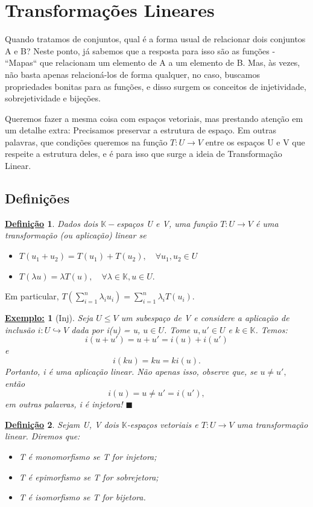 \documentclass{article}
\newtheorem*{def*}{\underline{Defini\c c\~ao}}
\newtheorem{example}{\underline{Exemplo:}}[section]
\renewcommand\qedsymbol{$\blacksquare$}
\begin{document}
\section{Transforma\c c\~oes Lineares}
Quando tratamos de conjuntos, qual \'e a forma usual de relacionar dois conjuntos A e B? Neste ponto, j\'a sabemos que a resposta para
isso s\~ao as fun\c c\~oes - ``Mapas`` que relacionam um elemento de A a um elemento de B. Mas, \`as vezes, n\~ao basta apenas relacion\'a-los de forma qualquer, no caso, buscamos propriedades bonitas para as fun\c c\~oes, e disso surgem os conceitos de injetividade,
sobrejetividade e bije\c c\~oes.

Queremos fazer a mesma coisa com espa\c cos vetoriais, mas prestando aten\c c\~ao em um detalhe extra: Precisamos
preservar a estrutura de espa\c co. Em outras palavras, que condi\c c\~oes queremos na fun\c c\~ao $T:U\rightarrow{V}$
entre os espa\c cos U e V que respeite a estrutura deles, e \'e para isso que surge a ideia de Transforma\c c\~ao
Linear.

\subsection{Defini\c c\~oes}

\begin{def*}
	Dados dois $\mathbb{K}-$espa\c cos U e V, uma fun\c c\~ao $T:U\rightarrow{V}$ \'e uma transforma\c c\~ao (ou aplica\c c\~ao) linear
	se
	\begin{itemize}
		\item [TL1)] $T(u_1 + u_2) = T(u_1) + T(u_2), \quad\forall u_1, u_2\in{U}$ \label{TL1}
		\item [TL2)] $T(\lambda u) = \lambda{T(u)}, \quad\forall\lambda\in{\mathbb{K}}, u\in{U}.$ \label{TL2}
	\end{itemize}
\end{def*}

Em particular, $T(\sum_{i=1}^{n}\lambda_iu_i) = \sum_{i=1}^{n}\lambda_iT(u_i).$
\begin{example}[Inj]
	Seja $U\leq{V}$ um subespa\c co de V e considere a aplica\c c\~ao de inclus\~ao $i:U\hookrightarrow V$ dada por
	i(u) = u, $u\in{U}$. Tome $u, u'\in{U}$ e $k\in\mathbb{K}$. Temos:
	$$
		i(u + u') = u + u' = i(u) + i(u')
	$$
	e
	$$
		i(ku) = ku = ki(u).
	$$
	Portanto, i \'e uma aplica\c c\~ao linear. N\~ao apenas isso, observe que, se $u\neq{u'},$ ent\~ao
	$$
		i(u) = u \neq u' = i(u'),
	$$
	em outras palavras, i \'e injetora!
	\qedsymbol
\end{example}
\begin{def*}
	Sejam U, V dois $\mathbb{K}$-espa\c cos vetoriais e $T: U\rightarrow V$ uma transforma\c c\~ao linear. Diremos
	que:
	\begin{itemize}
		\item [i)] T \'e monomorfismo se T for injetora; \label{MONO}
		\item [ii)] T \'e epimorfismo se T for sobrejetora; \label{EPIM}
		\item [iii)] T \'e isomorfismo se T for bijetora. \label{ISO}
	\end{itemize}
\end{def*}
\end{document}
